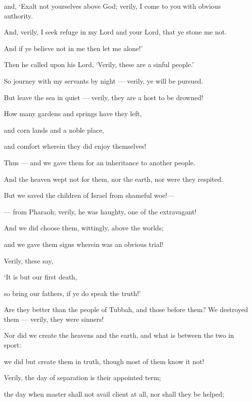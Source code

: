 \documentclass[fontsize=14pt, letterpaper, notitlepage, openany, DIV=12]{scrbook} %
\begin{document}
\noindent[44:19]
and, `Exalt not yourselves above God; verily, I come to you with obvious authority.

\noindent[44:20]
And, verily, I seek refuge in my Lord and your Lord, that ye stone me not.

\noindent[44:21]
And if ye believe not in me then let me alone!'

\noindent[44:22]
Then he called upon his Lord, `Verily, these are a sinful people.'

\noindent[44:23]
So journey with my servants by night --- verily, ye will be pursued.

\noindent[44:24]
But leave the sea in quiet --- verily, they are a host to be drowned!

\noindent[44:25]
How many gardens and springs have they left,

\noindent[44:26]
and corn lands and a noble place,

\noindent[44:27]
and comfort wherein they did enjoy themselves!

\noindent[44:28]
Thus --- and we gave them for an inheritance to another people.

\noindent[44:29]
And the heaven wept not for them, nor the earth, nor were they respited.

\noindent[44:30]
But we saved the children of Israel from shameful woe!---

\noindent[44:31]
--- from Pharaoh; verily, he was haughty, one of the extravagant!

\noindent[44:32]
And we did choose them, wittingly, above the worlds;

\noindent[44:33]
and we gave them signs wherein was an obvious trial!

\noindent[44:34]
Verily, these say,

\noindent[44:35]
`It is but our first death,

\noindent[44:36]
so bring our fathers, if ye do speak the truth!'

\noindent[44:37]
Are they better than the people of Tubbah, and those before them? We destroyed them ---
verily, they were sinners!

\noindent[44:38]
Nor did we create the heavens and the earth, and what is between the two in sport:

\noindent[44:39]
we did but create them in truth, though most of them know it not!

\noindent[44:40]
Verily, the day of separation is their appointed term;

\noindent[44:41]
the day when master shall not avail client at all, nor shall they be helped;
\end{document}
